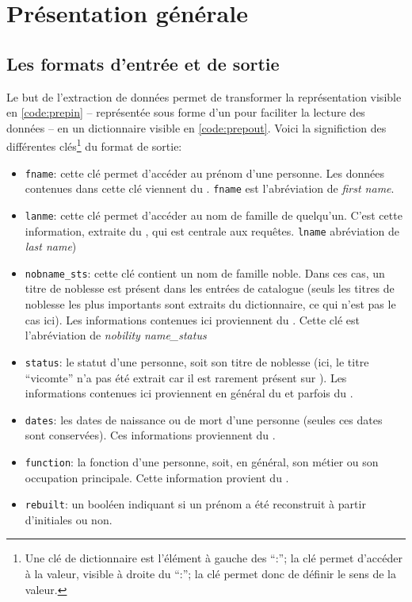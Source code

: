 \section{Présentation générale}
\subsection{Les formats d'entrée et de sortie}
Le but de l'extraction de données permet de transformer la représentation \tei{}  visible en \ref{code:prepin} -- représentée sous forme d'un \tsv{} pour faciliter la lecture des données -- en un \gls{dictionnaire} visible en \ref{code:prepout}. Voici la significtion des différentes clés\footnote{Une clé de \gls{dictionnaire} est l'élément à gauche des \enquote{:}; la clé permet d'accéder à la valeur, visible à droite du \enquote{:}; la clé permet donc de définir le sens de la valeur.} du format de sortie:
\begin{itemize}
	\item \texttt{fname}: cette clé permet d'accéder au prénom d'une personne. Les données contenues dans cette clé viennent du \tname{}. \texttt{fname} est l'abréviation de \textit{first name}.
	\item \texttt{lanme}: cette clé permet d'accéder au nom de famille de quelqu'un. C'est cette information, extraite du \tname{}, qui est centrale aux requêtes. \texttt{lname} abréviation de \textit{last name})
	\item \texttt{nobname\_sts}: cette clé contient un nom de famille noble. Dans ces cas, un titre de noblesse est présent dans les entrées de catalogue (seuls les titres de noblesse les plus importants sont extraits du dictionnaire, ce qui n'est pas le cas ici). Les informations contenues ici proviennent du \tname{}. Cette clé est l'abréviation de \textit{nobility name\_status}
	\item \texttt{status}: le statut d'une personne, soit son titre de noblesse (ici, le titre \enquote{vicomte} n'a pas été extrait car il est rarement présent sur \wkd{}). Les informations contenues ici proviennent en général du \tname{} et parfois du \ttrait{}.
	\item \texttt{dates}: les dates de naissance ou de mort d'une personne (seules ces dates sont conservées). Ces informations proviennent du \ttrait{}.
	\item \texttt{function}: la fonction d'une personne, soit, en général, son métier ou son occupation principale. Cette information provient du \ttrait{}.
	\item \texttt{rebuilt}: un booléen indiquant si un prénom a été reconstruit à partir d'initiales ou non.
\end{itemize}

